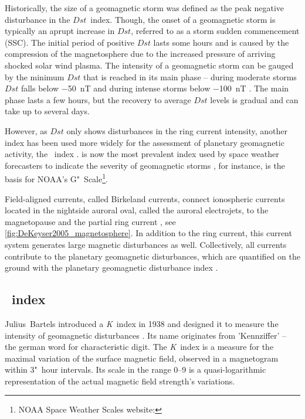 Historically, the size of a geomagnetic storm was defined as the peak negative disturbance in the $Dst$~index. Though, the onset of a geomagnetic storm is typically an aprupt increase in $Dst$, referred to as a storm sudden commencement (SSC). The initial period of positive $Dst$ lasts some hours and is caused by the compression of the magnetosphere due to the increased pressure of arriving shocked solar wind plasma. The intensity of a geomagnetic storm can be gauged by the minimum $Dst$ that is reached in its main phase -- during moderate storms $Dst$ falls below \SI{-50}{\nano\tesla} and during intense storms below \SI{-100}{\nano\tesla} \citep{Gonzalez1994}. The main phase lasts a few hours, but the recovery to average $Dst$ levels is gradual and can take up to several days.

However, as $Dst$ only shows disturbances in the ring current intensity, another index has been used more widely for the assessment of planetary geomagnetic activity, the \Kp~index \citep{Gonzalez1994}. \Kp{} is now the most prevalent index used by space weather forecasters to indicate the severity of geomagnetic storms \citep{Wing2005}, for instance, \Kp{} is the basis for NOAA's G"~Scale\footnote{NOAA Space Weather Scales website: }.

Field-aligned currents, called Birkeland currents, connect ionospheric currents located in the nightside auroral oval, called the auroral electrojets, to the magnetopause and the partial ring current \citep{Coxon2014}, see \autoref{fig:DeKeyser2005_magnetosphere}. In addition to the ring current, this current system generates large magnetic disturbances as well. Collectively, all currents contribute to the planetary geomagnetic disturbances, which are quantified on the ground with the planetary geomagnetic disturbance index \Kp{}.


\subsection{\Kp{}~index}
\label{sec:kp_index}
Julius~Bartels introduced a \textit{K}~index in 1938 and designed it to measure the intensity of geomagnetic disturbances \citep{Bartels1939}. Its name originates from 'Kennziffer' -- the german word for characteristic digit. The \textit{K}~index is a measure for the maximal variation of the surface magnetic field, observed in a magnetogram within 3"~hour intervals. Its scale in the range 0--9 is a quasi-logarithmic representation of the actual magnetic field strength's variations.

